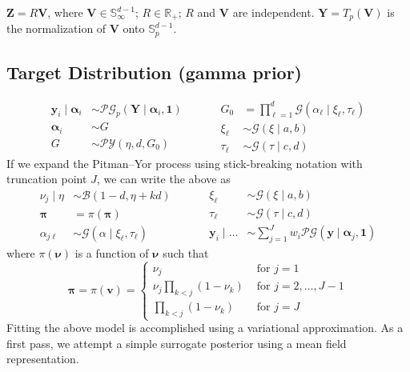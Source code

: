 $\bm{Z} = R\bm{V}$, where $\bm{V} \in \mathbb{S}_{\infty}^{d-1}$; 
$R \in \mathbb{R}_+$; $R$ and $\bm{V}$ are independent.  
$\bm{Y} = T_p(\bm{V})$ is the normalization of $\bm{V}$ onto 
$\mathbb{S}_p^{d-1}$.

\subsection{Target Distribution (gamma prior)}
\begin{equation}
    \begin{aligned}
        \bm{y}_i \mid \bm{\alpha}_i &\sim
        \mathcal{PG}_p\left(\bm{Y}\mid\bm{\alpha}_i,\bm{1}\right)\\
        \bm{\alpha}_i &\sim G\\
        G &\sim \mathcal{PY}\left(\eta, d, G_0\right)        
    \end{aligned}
    ~\hspace{1cm}
    \begin{aligned}
        G_0 &= {\textstyle\prod}_{\ell = 1}^{d}\mathcal{G}(\alpha_{\ell}\mid \xi_{\ell},\tau_{\ell})\\
        \xi_{\ell} &\sim \mathcal{G}(\xi\mid a, b)\\
        \tau_{\ell} &\sim \mathcal{G}(\tau\mid c, d)
    \end{aligned}
\end{equation}
If we expand the Pitman--Yor process using stick-breaking notation with truncation point $J$, we can write the above as
\begin{equation}
    \begin{aligned}
        \nu_j\mid\eta &\sim \mathcal{B}(1 - d, \eta + kd)\\
        \bm{\pi} &= \pi(\bm{\pi})\\
        \alpha_{j\ell} &\sim \mathcal{G}(\alpha\mid\xi_{\ell},\tau_{\ell})
    \end{aligned}
    ~\hspace{1cm}
    \begin{aligned}
        \xi_{\ell} &\sim \mathcal{G}(\xi \mid a, b)\\
        \tau_{\ell} &\sim \mathcal{G}(\tau\mid c, d)\\
        \bm{y}_i \mid \ldots &\sim {\textstyle\sum}_{j = 1}^Jw_i\mathcal{PG}(\bm{y}\mid\bm{\alpha}_j, \bm{1})
    \end{aligned}   
\end{equation}
where $\pi(\bm{\nu})$ is a function of $\bm{\nu}$ such that
\begin{equation*}
    \bm{\pi} = \pi(\bm{v}) = \begin{cases}
        \nu_j &\text{ for }j = 1\\
        \nu_j{\textstyle\prod}_{k < j}(1 - \nu_k) &\text{ for }j = 2,\ldots,J-1\\
        {\textstyle\prod}_{k < j}(1 - \nu_k) &\text{ for }j = J
    \end{cases}
\end{equation*}
Fitting the above model is accomplished using a variational approximation.  As a first pass, we attempt a simple surrogate posterior using a mean field representation.

